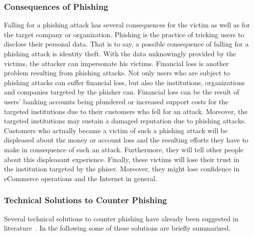 \subsubsection{Consequences of Phishing}
Falling for a phishing attack has several consequences for the victim as well as for the target company or organization. Phishing is the practice of tricking users to disclose their personal data. That is to say, a possible consequence of falling for a phishing attack is identity theft. With the data unknowingly provided by the victims, the attacker can impersonate his victims. Financial loss is another problem resulting from phishing attacks. Not only users who are subject to phishing attacks can suffer financial loss, but also the institutions, organizations and companies targeted by the phisher can. Financial loss can be the result of users' banking accounts being plundered or increased support costs for the targeted institutions due to their customers who fell for an attack. Moreover, the targeted institutions may sustain a damaged reputation due to phishing attacks. Customers who actually became a victim of such a phishing attack will be displeased about the money or account loss and the resulting efforts they have to make in consequence of such an attack. Furthermore, they will tell other people about this displeasant experience. Finally, these victims will lose their trust in the institution targeted by the phiser. Moreover, they might lose confidence in eCommerce operations and the Internet in general.

\subsubsection{Technical Solutions to Counter Phishing}

Several technical solutions to counter phishing have already been suggested in literature~\cite{purkait2012phishing}. In the following some of these solutions are briefly summarized.

